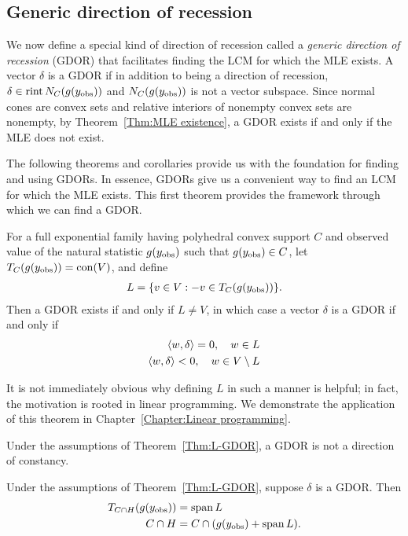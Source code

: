 \subsection{Generic direction of recession}
We now define a special kind of direction of recession called a 
\emph{generic direction of recession} (GDOR) that facilitates finding the 
LCM for which the MLE exists.
A vector $\delta$ is a GDOR if in addition to being a direction of recession,  
$\delta \in \operatorname{rint} N_C(g(y_{\text{obs}}))$ and $N_C(g(y_{\text{obs}}))$ is not a vector subspace.
Since normal cones are convex sets and relative interiors of nonempty convex sets 
are nonempty, by Theorem~\ref{Thm:MLE existence},
a GDOR exists if and only if the MLE does not exist.

The following theorems and corollaries provide us with the foundation
for finding and using GDORs.  In essence, GDORs give us a convenient way
to find an LCM for which the MLE exists.
This first theorem provides the framework through
which we can find a GDOR.  
\begin{theorem} \label{Thm:L-GDOR}
For a full exponential family having polyhedral convex support $C$ and observed value 
of the natural statistic $g(y_{\text{obs}})$ such that $g(y_{\text{obs}}) \in C$, 
let $T_C(g(y_{\text{obs}}) ) = \operatorname{con}(V)$, and define
\begin{align*}
	L = \{ v \in V: -v \in T_C(g(y_{\text{obs}})) \}.
\end{align*}
Then a GDOR exists if and only if $L \neq V$, in which case a vector $\delta$ is a GDOR if and 
only if
\begin{align*}
	\langle w, \delta \rangle = 0, \quad w \in L \\
	\langle w, \delta \rangle < 0, \quad w \in V \setminus L \\
\end{align*}
\end{theorem}
It is not immediately obvious why defining $L$ in such a manner is helpful; in fact,
the motivation is rooted in linear programming.  We demonstrate the application of 
this theorem in Chapter~\ref{Chapter:Linear programming}.

\begin{corollary}
Under the assumptions of Theorem~\ref{Thm:L-GDOR}, a GDOR is not a direction of constancy.
\end{corollary}

\begin{corollary} \label{Cor:spanL}
Under the assumptions of Theorem~\ref{Thm:L-GDOR}, suppose $\delta$ is a GDOR.  Then
\begin{align*}
	T_{C \cap H} (g(y_{\text{obs}})) &= \operatorname{span} L \\
	C \cap H &= C \cap (g(y_{\text{obs}}) + \operatorname{span} L ). \\
\end{align*}
\end{corollary}

